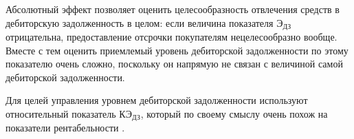  Абсолютный эффект позволяет оценить целесообразность отвлечения средств в дебиторскую задолженность в целом: если величина показателя $\text{Э}_\text{ДЗ}$ отрицательна, предоставление отсрочки покупателям нецелесообразно вообще.
 Вместе с тем оценить приемлемый уровень дебиторской задолженности по этому показателю очень сложно, поскольку он напрямую не связан с величиной самой дебиторской задолженности.
 
 Для целей управления уровнем дебиторской задолженности используют относительный показатель $  \text{КЭ}_\text{ДЗ}$, который по своему смыслу очень похож на показатели рентабельности \cite[229--232]{nezamaikin}.
 
 
 
 
 
 
 
 
 
 
 
 